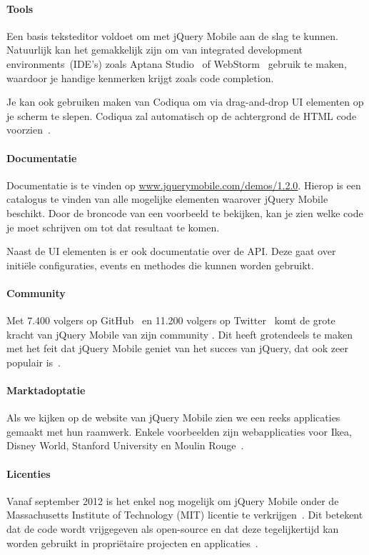 \paragraph{Tools}
Een basis teksteditor voldoet om met jQuery Mobile aan de slag te kunnen. Natuurlijk kan het gemakkelijk zijn om van integrated development environments~(IDE's) zoals Aptana Studio~\cite{Aptana2012} of WebStorm~\cite{JetBrains2012} gebruik te maken, waardoor je handige kenmerken krijgt zoals code completion.

Je kan ook gebruiken maken van Codiqua om via drag-and-drop UI elementen op je scherm te slepen. Codiqua zal automatisch op de achtergrond de HTML code voorzien~\cite{Sperry2012}.

\paragraph{Documentatie}
Documentatie is te vinden op \url{www.jquerymobile.com/demos/1.2.0}. Hierop is een catalogus te vinden van alle mogelijke elementen waarover jQuery Mobile beschikt. Door de broncode van een voorbeeld te bekijken, kan je zien welke code je moet schrijven om tot dat resultaat te komen.

Naast de UI elementen is er ook documentatie over de API. Deze gaat over initiële configuraties, events en methodes die kunnen worden gebruikt.

\paragraph{Community}
Met 7.400 volgers op GitHub~\cite{GitHub2012} en 11.200 volgers op Twitter~\cite{Twitter2012} komt de grote kracht van jQuery Mobile van zijn community . Dit heeft grotendeels te maken met het feit dat jQuery Mobile geniet van het succes van jQuery, dat ook zeer populair is~\cite{Hales2012}.

\paragraph{Marktadoptatie}
Als we kijken op de website van jQuery Mobile zien we een reeks applicaties gemaakt met hun raamwerk. Enkele voorbeelden zijn webapplicaties voor Ikea, Disney World, Stanford University en Moulin Rouge~\cite{JQuery2012a}. 

\paragraph{Licenties}
Vanaf september 2012 is het enkel nog mogelijk om jQuery Mobile onder de Massachusetts Institute of Technology (MIT) licentie te verkrijgen~\cite{Dmethvin2012}. Dit betekent dat de code wordt vrijgegeven als open-source en dat deze tegelijkertijd kan worden gebruikt in propriëtaire projecten en applicaties~\cite{PhilDutson2012}.

